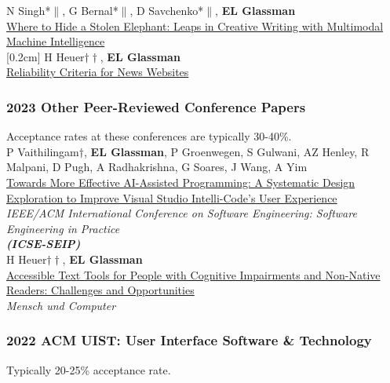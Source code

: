 \documentclass[10pt, a4paper]{article}
\newcommand{\years}[1]{\marginnote{\normalsize #1}}
\begin{document}
\years{\textbf{J4}}N Singh*$\|$, G Bernal*$\|$, D Savchenko*$\|$, \textbf{EL Glassman}\\
\href{http://glassmanlab.seas.harvard.edu/papers/elephant_tochi2022.pdf}{Where to Hide a Stolen Elephant: Leaps in Creative Writing with Multimodal Machine Intelligence}\\
[0.2cm]
\years{\textbf{J3}}H Heuer$\dagger\dagger$, \textbf{EL Glassman}\\
\href{http://glassmanlab.seas.harvard.edu/papers/reliability_criteria.pdf}{Reliability Criteria for News Websites}


\subsubsection*{2023 Other Peer-Reviewed Conference Papers}
Acceptance rates at these conferences are typically 30-40\%.\\

\years{\textbf{C28}}P Vaithilingam$\dagger$, \textbf{EL Glassman}, P Groenwegen, S Gulwani, AZ Henley, R Malpani, D Pugh, A Radhakrishna, G Soares, J Wang, A Yim\\ \href{http://glassmanlab.seas.harvard.edu/papers/Vaithilingam2023ICSE_IntelliCode.pdf}{Towards More Effective AI-Assisted Programming: A Systematic Design Exploration to Improve Visual Studio Intelli-Code’s User Experience}\\
\emph{IEEE/ACM International Conference on Software Engineering: Software Engineering in Practice\\
\textbf{(ICSE-SEIP)}}\\%
[0.2cm]
\years{\textbf{C27}}H Heuer$\dagger\dagger$, \textbf{EL Glassman}\\
\href{http://glassmanlab.seas.harvard.edu/papers/accessible_text_tools_MuC23.pdf}{Accessible Text Tools for People with Cognitive Impairments and Non-Native Readers: Challenges and Opportunities}\\
\emph{Mensch und Computer}

\subsubsection*{2022 ACM \textbf{UIST}: User Interface Software \& Technology }
Typically 20-25\% acceptance rate.\\
\end{document}
